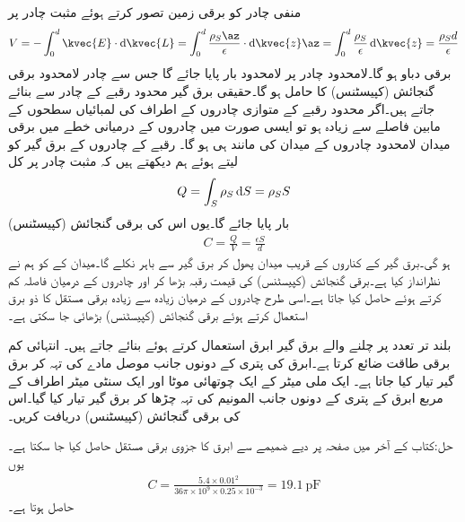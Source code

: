 منفی چادر کو برقی زمین تصور کرتے ہوئے مثبت چادر پر
\begin{align*}
V=-\int_0^d \kvec{E} \cdot \dif \kvec{L}=\int_0^d \frac{\rho_S \az}{\epsilon} \cdot \dif \kvec{z} \az=\int_0^d \frac{\rho_S }{\epsilon}  \dif \kvec{z}=\frac{\rho_S d}{\epsilon}
\end{align*}
برقی دباو ہو گا۔لامحدود چادر پر لامحدود بار پایا جائے گا جس سے چادر لامحدود برقی گنجائش (کپیسٹنس) کا حامل ہو گا۔حقیقی برق گیر محدود رقبے کے چادر سے بنائے جاتے ہیں۔اگر محدود رقبے کے متوازی چادروں کے اطراف کی لمبائیاں سطحوں کے مابین فاصلے سے زیادہ ہو تو ایسی صورت میں چادروں کے درمیانی خطے میں برقی میدان  لامحدود چادروں کے میدان کی مانند ہی ہو گا۔  رقبے کے چادروں کے برق گیر کو لیتے ہوئے ہم دیکھتے ہیں کہ مثبت چادر پر کل
\begin{align*}
Q=\int_S \rho_S \dif S=\rho_S S
\end{align*}
بار پایا جائے  گا۔یوں اس کی برقی گنجائش (کپیسٹنس)
\begin{align}\label{مساوات_کپیسٹر_دو_چادر_کپیسٹر}
C=\frac{Q}{V}=\frac{\epsilon S}{d}
\end{align}
ہو گی۔برق گیر کے کناروں کے قریب میدان پھول کر برق گیر سے باہر نکلے گا۔میدان کے  کو ہم نے نظرانداز کیا ہے۔برقی گنجائش (کپیسٹنس) کی قیمت رقبہ بڑھا کر اور چادروں کے درمیان فاصلہ کم کرتے ہوئے حاصل کیا جاتا ہے۔اسی طرح چادروں کے درمیان زیادہ سے زیادہ برقی مستقل کا ذو برق استعمال کرتے ہوئے برقی گنجائش (کپیسٹنس) بڑھائی جا سکتی ہے۔

بلند تر تعدد پر چلنے والے برق گیر ابرق استعمال کرتے ہوئے بنائے جاتے ہیں۔ انتہائی کم برقی طاقت ضائع کرتا ہے۔ابرق کی پتری کے دونوں جانب موصل مادے کی تہہ  کر برق گیر تیار کیا جاتا ہے۔
ایک ملی میٹر کے ایک چوتھائی موٹا اور ایک سنٹی میٹر اطراف کے مربع ابرق کے پتری کے دونوں جانب المونیم کی تہہ چڑھا کر برق گیر تیار کیا گیا۔اس کی برقی گنجائش (کپیسٹنس) دریافت کریں۔

حل:کتاب کے آخر میں صفحہ  پر دیے ضمیمے سے ابرق کا جزوی برقی مستقل  حاصل کیا جا سکتا ہے۔یوں
\begin{align*}
C=\frac{5.4 \times 0.01^2}{36 \pi \times 10^9 \times 0.25 \times 10^{-3}}=\SI{19.1}{\pico \farad}
\end{align*}
حاصل ہوتا ہے۔

